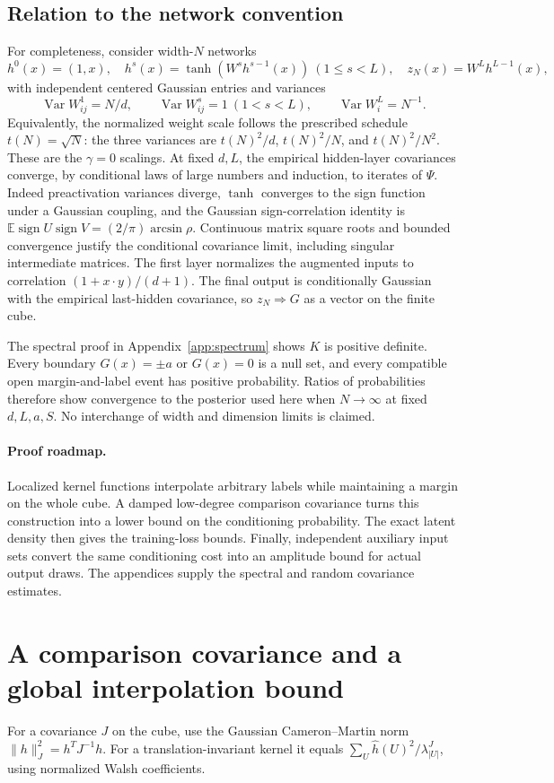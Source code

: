 \documentclass[11pt]{article}
\theoremstyle{remark}\newtheorem{remark}[theorem]{Remark}
\DeclareMathOperator{\Var}{Var}
\DeclareMathOperator{\sign}{sign}
\newcommand{\E}{\mathbb E}
\begin{document}
\subsection{Relation to the network convention}
For completeness, consider width-$N$ networks
\[
 h^0(x)=(1,x),\quad h^s(x)=\tanh(W^sh^{s-1}(x))\ (1\le s<L),\quad z_N(x)=W^Lh^{L-1}(x),
\]
with independent centered Gaussian entries and variances
\[
 \Var W^1_{ij}=N/d,\qquad \Var W^s_{ij}=1\ (1<s<L),\qquad \Var W^L_i=N^{-1}.
\]
Equivalently, the normalized weight scale follows the prescribed schedule
$t(N)=\sqrt N$: the three variances are $t(N)^2/d$, $t(N)^2/N$,
and $t(N)^2/N^2$. These are the $\gamma=0$ scalings. At fixed $d,L$, the empirical hidden-layer covariances converge, by conditional laws of large numbers and induction, to iterates of $\Psi$. Indeed preactivation variances diverge, $\tanh$ converges to the sign function under a Gaussian coupling, and the Gaussian sign-correlation identity is $\E\sign U\sign V=(2/\pi)\arcsin\rho$. Continuous matrix square roots and bounded convergence justify the conditional covariance limit, including singular intermediate matrices. The first layer normalizes the augmented inputs to correlation $(1+x\cdot y)/(d+1)$. The final output is conditionally Gaussian with the empirical last-hidden covariance, so $z_N\Rightarrow G$ as a vector on the finite cube.

The spectral proof in Appendix~\ref{app:spectrum} shows $K$ is positive definite. Every boundary $G(x)=\pm a$ or $G(x)=0$ is a null set, and every compatible open margin-and-label event has positive probability. Ratios of probabilities therefore show convergence to the posterior used here when $N\to\infty$ at fixed $d,L,a,S$. No interchange of width and dimension limits is claimed.

\paragraph{Proof roadmap.}
Localized kernel functions interpolate arbitrary labels while maintaining
a margin on the whole cube. A damped low-degree comparison covariance
turns this construction into a lower bound on the conditioning
probability. The exact latent density then gives the training-loss
bounds. Finally, independent auxiliary input sets convert the same
conditioning cost into an amplitude bound for actual output draws.
The appendices supply the spectral and random covariance estimates.

\section{A comparison covariance and a global interpolation bound}
For a covariance $J$ on the cube, use the Gaussian Cameron--Martin norm $\|h\|_J^2=h^TJ^{-1}h$. For a translation-invariant kernel it equals $\sum_U\widehat h(U)^2/\lambda^J_{|U|}$, using normalized Walsh coefficients.
\end{document}
